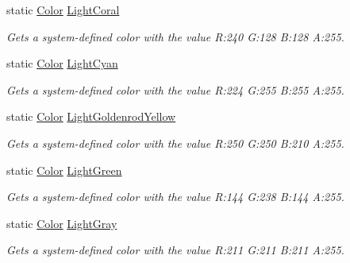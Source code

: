 \begin{DoxyCompactItemize}
static \hyperlink{struct_microsoft_1_1_xna_1_1_framework_1_1_color}{Color} \hyperlink{struct_microsoft_1_1_xna_1_1_framework_1_1_color_adab9f40154561138f8d5442bbeae83c2}{Light\+Coral}
\begin{DoxyCompactList}\small\item\em Gets a system-\/defined color with the value R\+:240 G\+:128 B\+:128 A\+:255.\end{DoxyCompactList}\item 
static \hyperlink{struct_microsoft_1_1_xna_1_1_framework_1_1_color}{Color} \hyperlink{struct_microsoft_1_1_xna_1_1_framework_1_1_color_aa6016c56f1299f4a5287f0738c816e75}{Light\+Cyan}
\begin{DoxyCompactList}\small\item\em Gets a system-\/defined color with the value R\+:224 G\+:255 B\+:255 A\+:255.\end{DoxyCompactList}\item 
static \hyperlink{struct_microsoft_1_1_xna_1_1_framework_1_1_color}{Color} \hyperlink{struct_microsoft_1_1_xna_1_1_framework_1_1_color_a90c16d976e97b0d3abe47073844af558}{Light\+Goldenrod\+Yellow}
\begin{DoxyCompactList}\small\item\em Gets a system-\/defined color with the value R\+:250 G\+:250 B\+:210 A\+:255.\end{DoxyCompactList}\item 
static \hyperlink{struct_microsoft_1_1_xna_1_1_framework_1_1_color}{Color} \hyperlink{struct_microsoft_1_1_xna_1_1_framework_1_1_color_a4bd3d56c52d8075c17d4a26cc8a16d54}{Light\+Green}
\begin{DoxyCompactList}\small\item\em Gets a system-\/defined color with the value R\+:144 G\+:238 B\+:144 A\+:255.\end{DoxyCompactList}\item 
static \hyperlink{struct_microsoft_1_1_xna_1_1_framework_1_1_color}{Color} \hyperlink{struct_microsoft_1_1_xna_1_1_framework_1_1_color_aa5d88fef19c42987ad200af93a3cf587}{Light\+Gray}
\begin{DoxyCompactList}\small\item\em Gets a system-\/defined color with the value R\+:211 G\+:211 B\+:211 A\+:255.\end{DoxyCompactList}\item 

\end{DoxyCompactItemize}
